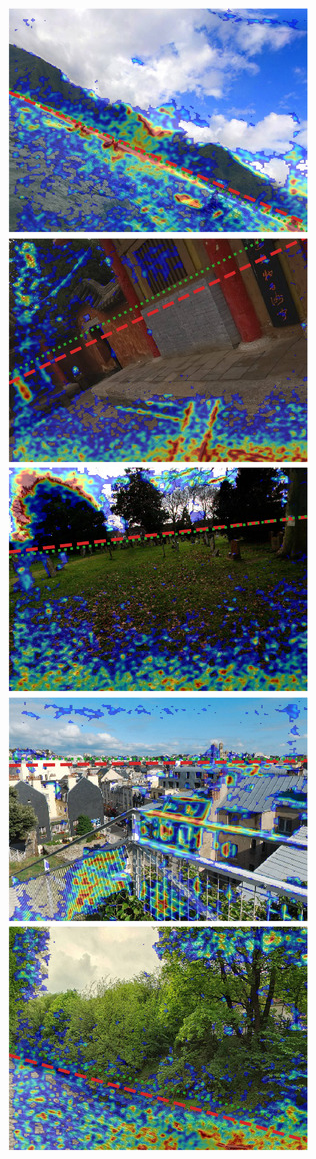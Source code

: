 \includegraphics{sgbp/thumb/pano_addgasjevqjafh-1.jpg}
\includegraphics{sgbp/thumb/pano_addgtzfdddfgrh-2.jpg}
\includegraphics{sgbp/thumb/pano_addhxkomphqrlr-4.jpg}
\includegraphics{sgbp/thumb/pano_addkkzvqqxujqf-0.jpg}
\includegraphics{sgbp/thumb/pano_addlmffiaizqlx-0.jpg}
